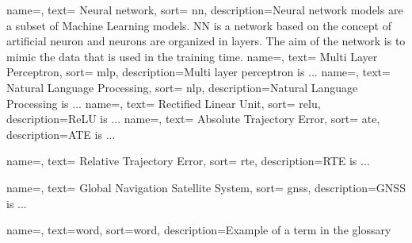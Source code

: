 {
    name=,
    text= Neural network,
    sort= nn,
    description={Neural network models are a subset of Machine Learning models. NN is a network based on the concept of artificial neuron and neurons are organized in layers. The aim of the network is to mimic the data that is used in the training time. }
}
{
    name=,
    text= Multi Layer Perceptron,
    sort= mlp,
    description={Multi layer perceptron is ...}
}
{
    name=,
    text= Natural Language Processing,
    sort= nlp,
    description={Natural Language Processing is ...}
}
{
    name=,
    text= Rectified Linear Unit,
    sort= relu,
    description={ReLU is ...} %
}
{
    name=,
    text= Absolute Trajectory Error,
    sort= ate,
    description={ATE is ...} %
}

{
    name=,
    text= Relative Trajectory Error,
    sort= rte,
    description={RTE is ...} %
}

{
    name=,
    text= Global Navigation Satellite System,
    sort= gnss,
    description={GNSS is ...} %
}




{
    name=,
    text=word,
    sort=word,
    description={Example of a term in the glossary}
}

